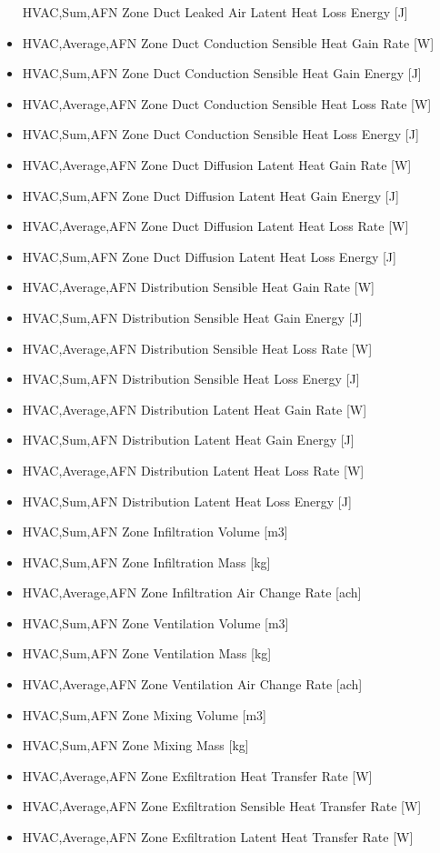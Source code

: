 \begin{itemize}
  HVAC,Sum,AFN Zone Duct Leaked Air Latent Heat Loss Energy {[}J{]}
\item
  HVAC,Average,AFN Zone Duct Conduction Sensible Heat Gain Rate {[}W{]}
\item
  HVAC,Sum,AFN Zone Duct Conduction Sensible Heat Gain Energy {[}J{]}
\item
  HVAC,Average,AFN Zone Duct Conduction Sensible Heat Loss Rate {[}W{]}
\item
  HVAC,Sum,AFN Zone Duct Conduction Sensible Heat Loss Energy {[}J{]}
\item
  HVAC,Average,AFN Zone Duct Diffusion Latent Heat Gain Rate {[}W{]}
\item
  HVAC,Sum,AFN Zone Duct Diffusion Latent Heat Gain Energy {[}J{]}
\item
  HVAC,Average,AFN Zone Duct Diffusion Latent Heat Loss Rate {[}W{]}
\item
  HVAC,Sum,AFN Zone Duct Diffusion Latent Heat Loss Energy {[}J{]}
\item
  HVAC,Average,AFN Distribution Sensible Heat Gain Rate {[}W{]}
\item
  HVAC,Sum,AFN Distribution Sensible Heat Gain Energy {[}J{]}
\item
  HVAC,Average,AFN Distribution Sensible Heat Loss Rate {[}W{]}
\item
  HVAC,Sum,AFN Distribution Sensible Heat Loss Energy {[}J{]}
\item
  HVAC,Average,AFN Distribution Latent Heat Gain Rate {[}W{]}
\item
  HVAC,Sum,AFN Distribution Latent Heat Gain Energy {[}J{]}
\item
  HVAC,Average,AFN Distribution Latent Heat Loss Rate {[}W{]}
\item
  HVAC,Sum,AFN Distribution Latent Heat Loss Energy {[}J{]}
\item
  HVAC,Sum,AFN Zone Infiltration Volume {[}m3{]}
\item
  HVAC,Sum,AFN Zone Infiltration Mass {[}kg{]}
\item
  HVAC,Average,AFN Zone Infiltration Air Change Rate {[}ach{]}
\item
  HVAC,Sum,AFN Zone Ventilation Volume {[}m3{]}
\item
  HVAC,Sum,AFN Zone Ventilation Mass {[}kg{]}
\item
  HVAC,Average,AFN Zone Ventilation Air Change Rate {[}ach{]}
\item
  HVAC,Sum,AFN Zone Mixing Volume {[}m3{]}
\item
  HVAC,Sum,AFN Zone Mixing Mass {[}kg{]}
\item
  HVAC,Average,AFN Zone Exfiltration Heat Transfer Rate {[}W{]}
\item
  HVAC,Average,AFN Zone Exfiltration Sensible Heat Transfer Rate {[}W{]}
\item
  HVAC,Average,AFN Zone Exfiltration Latent Heat Transfer Rate {[}W{]}
\end{itemize}

